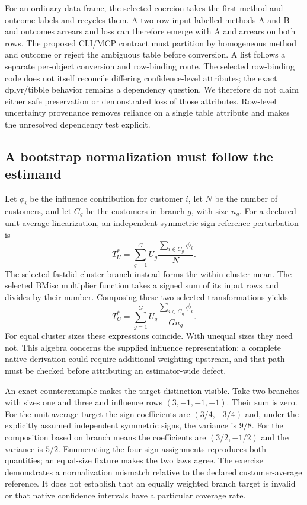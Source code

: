 For an ordinary data frame, the selected coercion takes the first method and outcome labels and recycles them. A two-row input labelled methods A and B and outcomes arrears and loss can therefore emerge with A and arrears on both rows. The proposed CLI/MCP contract must partition by homogeneous method and outcome or reject the ambiguous table before conversion. A list follows a separate per-object conversion and row-binding route. The selected row-binding code does not itself reconcile differing confidence-level attributes; the exact dplyr/tibble behavior remains a dependency question. We therefore do not claim either safe preservation or demonstrated loss of those attributes. Row-level uncertainty provenance removes reliance on a single table attribute and makes the unresolved dependency test explicit.~\citep{exec29_panel_inference_sources,exec29_panel_inference_reference}

\subsection{A bootstrap normalization must follow the estimand}

Let $\phi_i$ be the influence contribution for customer $i$, let $N$ be the number of customers, and let $C_g$ be the customers in branch $g$, with size $n_g$. For a declared unit-average linearization, an independent symmetric-sign reference perturbation is
\[
 T_U^*=\sum_{g=1}^{G}U_g\frac{\sum_{i\in C_g}\phi_i}{N}.
\]
The selected fastdid cluster branch instead forms the within-cluster mean. The selected BMisc multiplier function takes a signed sum of its input rows and divides by their number. Composing these two selected transformations yields
\[
 T_C^*=\sum_{g=1}^{G}U_g\frac{\sum_{i\in C_g}\phi_i}{G n_g}.
\]
For equal cluster sizes these expressions coincide. With unequal sizes they need not. This algebra concerns the supplied influence representation: a complete native derivation could require additional weighting upstream, and that path must be checked before attributing an estimator-wide defect.~\citep{exec28_panel_delegates,exec29_panel_inference_sources}

An exact counterexample makes the target distinction visible. Take two branches with sizes one and three and influence rows $(3,-1,-1,-1)$. Their sum is zero. For the unit-average target the sign coefficients are $(3/4,-3/4)$ and, under the explicitly assumed independent symmetric signs, the variance is $9/8$. For the composition based on branch means the coefficients are $(3/2,-1/2)$ and the variance is $5/2$. Enumerating the four sign assignments reproduces both quantities; an equal-size fixture makes the two laws agree. The exercise demonstrates a normalization mismatch relative to the declared customer-average reference. It does not establish that an equally weighted branch target is invalid or that native confidence intervals have a particular coverage rate.~\citep{exec29_panel_inference_reference}

